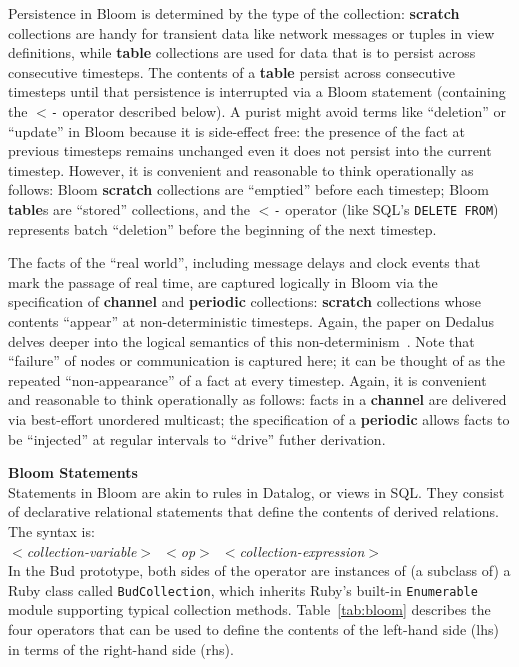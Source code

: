 Persistence in Bloom is determined by the type of the collection:  \textbf{scratch} collections are handy for transient data like network messages or tuples in view definitions, while \textbf{table} collections are used for data that is to persist across consecutive timesteps.  The contents of a \textbf{table} persist across consecutive timesteps until that persistence is interrupted via a Bloom statement (containing the \texttt{$<$-} operator described below).  A purist might avoid terms like ``deletion'' or ``update'' in Bloom because it is side-effect free: the presence of the fact at previous timesteps remains unchanged even it does not persist into the current timestep.  However, it is convenient and reasonable to think operationally as follows: Bloom \textbf{scratch} collections are ``emptied'' before each timestep; Bloom \textbf{table}s are ``stored'' collections, and the \texttt{$<$-} operator (like SQL's \texttt{DELETE FROM}) represents batch ``deletion'' before the beginning of the next timestep.

The facts of the ``real world'', including message delays and clock events that mark the passage of real time, are captured logically in Bloom via the specification of \textbf{channel} and \textbf{periodic} collections: \textbf{scratch} collections whose contents ``appear'' at non-deterministic timesteps. 
Again, the paper on Dedalus delves deeper into the logical semantics of this non-determinism~\cite{dedalus-techr}.  Note that ``failure'' of nodes or communication is captured here; it can be thought of as the repeated ``non-appearance'' of a fact at every timestep.  Again, it is convenient and reasonable to think operationally as follows: facts in a \textbf{channel} are delivered via best-effort unordered multicast; the specification of a \textbf{periodic} allows facts to be ``injected'' at regular intervals to ``drive'' futher derivation.

\textbf{Bloom Statements}\\
\noindent
Statements in Bloom are akin to rules in Datalog, or views in SQL.  They consist of declarative relational statements that define the contents of derived relations.  The syntax is:\\
\noindent
\mbox{\hspace{0.25in}\emph{$<$collection-variable$>$ $<$op$>$ $<$collection-expression$>$}}\\
\noindent
In the Bud prototype, both sides of the operator are instances of (a subclass of) a Ruby class called \texttt{BudCollection}, which inherits Ruby's built-in \texttt{Enumerable} module supporting typical collection methods.  Table~\ref{tab:bloom} describes the four operators that can be used to define the contents of the left-hand side (lhs) in terms of the right-hand side (rhs).

